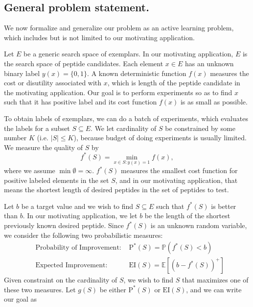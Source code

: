 \documentclass[opre,nonblindrev]{informs3} %
\newcommand{\E}{\mathbb{E}}
\newcommand{\EI}{\mathrm{EI}}
\newcommand{\PI}{\text{P}^*}
\begin{document}
\subsection{General problem statement.} 
We now formalize and generalize our problem as an active learning problem, which includes but is not limited to our motivating application.

Let $E$ be a generic search space of exemplars.  In our motivating application, $E$ is the search space of peptide candidates. Each element $x \in E$ has an unknown binary label $y(x)=\{0,1\}$.  A known deterministic function $f(x)$ measures the cost or disutility associated with $x$, which is length of the peptide candidate in the motivating application. Our goal is to perform experiments so as to find $x$ such that it has positive label and its cost function $f(x)$ is as small as
possible.

To obtain labels of exemplars, we can do a batch of experiments, which evaluates the labels for a subset $S \subseteq E$. We let cardinality of $S$ be constrained by some number $K$ (i.e. $|S| \leq K$), because budget of doing experiments is usually limited. We measure the quality of $S$ by 
\begin{equation} \label{eq:fS}
f^*(S)= \underset{x \in S:y(x)=1}{\min} f(x),
\end{equation}
where we assume $\min \emptyset = \infty$. $f^*(S)$ measures the smallest cost function for positive labeled elements in the set $S$, and in our motivating application, that means the shortest length of desired peptides in the set of peptides to test.


Let $b$ be a target value and we wish to find $S\subseteq E$ such that $f^*(S)$ is better than $b$. In our motivating application, we let $b$ be the length of the shortest previously known desired peptide. Since $f^*(S)$ is an unknown random variable, we consider the following two probabilistic measures:
\begin{equation} \label{eq:twomeasure}
  \begin{aligned}
    &\text{Probability of Improvement: }&\PI(S) = \mathbb{P}(f^*(S) < b)\\
    &\text{Expected Improvement: }&\EI(S) = \E [(b-f^*(S))^+]
  \end{aligned}
\end{equation}
Given constraint on the cardinality of $S$, we wish to find $S$ that maximizes one of these two measures. Let $g(S)$ be either $\PI(S)$ or $\EI(S)$, and we can write our goal as
\end{document}
